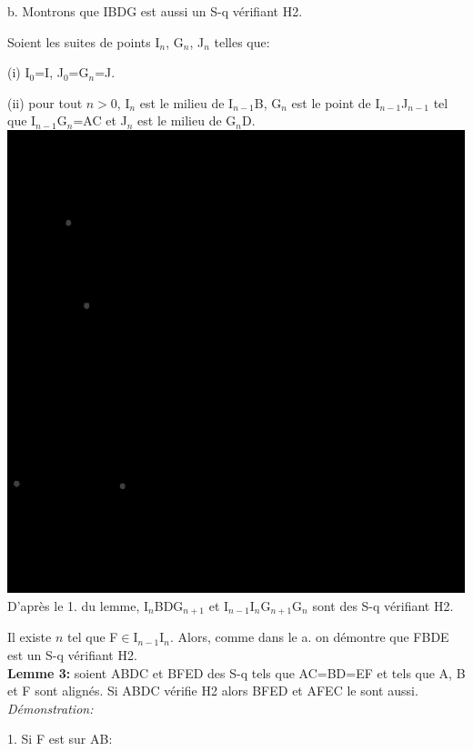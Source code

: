 \documentclass[a4paper, 12pt, twoside]{book}
\begin{document}
b. Montrons que IBDG est aussi un S-q vérifiant H2.\

Soient les suites de points I$_{n}$, G$_{n}$, J$_{n}$ telles que:\

(i) I$_{0}$=I, J$_{0}$=G$_{n}$=J.\

(ii) pour tout $n>$0, I$_{n}$ est le milieu de I$_{n-1}$B, G$_{n}$ est le point de I$_{n-1}$J$_{n-1}$ tel que I$_{n-1}$G$_{n}$=AC et J$_{n}$ est le milieu de G$_{n}$D.\\


  \includegraphics[scale=0.7]{figures/sacc137ter.eps}\\
 
 
 D'après le 1. du lemme, I$_{n}$BDG$_{n+1}$ et I$_{n-1}$I$_{n}$G$_{n+1}$G$_{n}$ sont des S-q vérifiant H2.\
 
 Il existe $n$ tel que F$\in$I$_{n-1}$I$_{n}$. Alors, comme dans le a. on démontre que FBDE est un S-q vérifiant H2.\\ 
 
 
\newpage \textbf{Lemme 3:} soient ABDC et BFED des S-q  tels que AC=BD=EF et tels que A, B et F sont alignés. Si ABDC vérifie H2 alors BFED et AFEC le sont aussi.\\

\textit{Démonstration:}\

1. Si F est sur AB:\\
\end{document}
